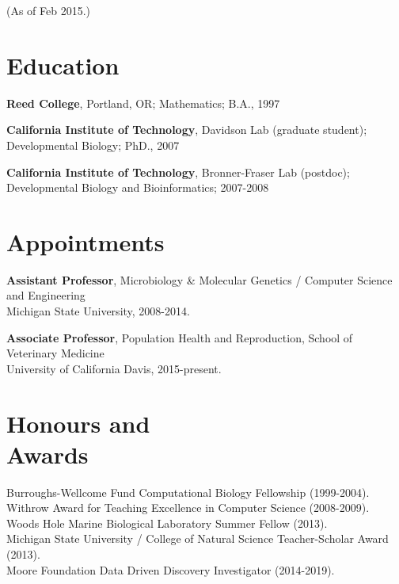 \documentclass[margin,line]{resume}
\begin{document}
\pagestyle{plain}


\begin{resume}



    {\small (As of Feb 2015.)}

    \section{\mysidestyle Education}

    {\bf Reed College}, Portland, OR; Mathematics; B.A., 1997

    \vspace{2mm}

    {\bf California Institute of Technology}, Davidson Lab (graduate student);
\\
Developmental Biology; PhD., 2007

    \vspace{2mm}

    {\bf California Institute of Technology}, Bronner-Fraser Lab (postdoc);\\
 Developmental Biology and Bioinformatics; 2007-2008

    \vspace{2mm}

    \section{\mysidestyle Appointments}

    {\bf Assistant Professor}, 
Microbiology \& Molecular Genetics / Computer Science and Engineering\\
Michigan State University, 2008-2014.

    {\bf Associate Professor}, 
Population Health and Reproduction, School of Veterinary Medicine \\
University of California Davis, 2015-present.

    \section{\mysidestyle Honours and\\Awards} 

Burroughs-Wellcome Fund Computational Biology Fellowship (1999-2004).\\
Withrow Award for Teaching Excellence in Computer Science (2008-2009). \\
Woods Hole Marine Biological Laboratory Summer Fellow (2013).\\
Michigan State University / College of Natural Science Teacher-Scholar Award (2013).\\
Moore Foundation Data Driven Discovery Investigator (2014-2019).



\end{resume}
\end{document}
